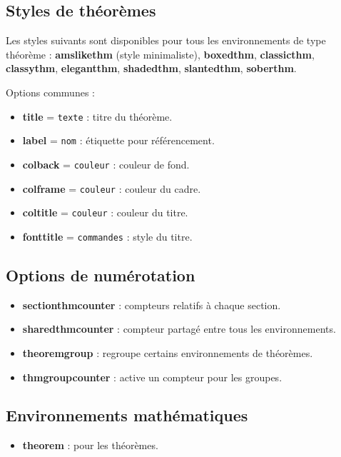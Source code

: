 \documentclass[
    french,
    margin=2cm
]{neoschool}
\begin{document}
\subsection{Styles de théorèmes}

Les styles suivants sont disponibles pour tous les environnements de
type théorème : \textbf{amslikethm} (style minimaliste), \textbf{boxedthm}, \textbf{classicthm}, \textbf{classythm}, \textbf{elegantthm}, \textbf{shadedthm}, \textbf{slantedthm}, \textbf{soberthm}.

Options communes :

\begin{itemize}
\item \textbf{title} = \texttt{texte} : titre du théorème.
\item \textbf{label} = \texttt{nom} : étiquette pour
  référencement.
\item \textbf{colback} = \texttt{couleur} : couleur de fond.
\item \textbf{colframe} = \texttt{couleur} : couleur du
  cadre.
\item \textbf{coltitle} = \texttt{couleur} : couleur du
  titre.
\item \textbf{fonttitle} = \texttt{commandes} : style du
  titre.
\end{itemize}

\subsection{Options de numérotation}

\begin{itemize}
\item \textbf{sectionthmcounter} : compteurs relatifs à chaque section.
\item \textbf{sharedthmcounter} : compteur partagé entre tous les
  environnements.
\item \textbf{theoremgroup} : regroupe certains environnements de théorèmes.
\item \textbf{thmgroupcounter} : active un compteur pour les groupes.
\end{itemize}

\subsection{Environnements mathématiques}

\begin{itemize}
\item \textbf{theorem} : pour les théorèmes.
\end{itemize}
\end{document}
